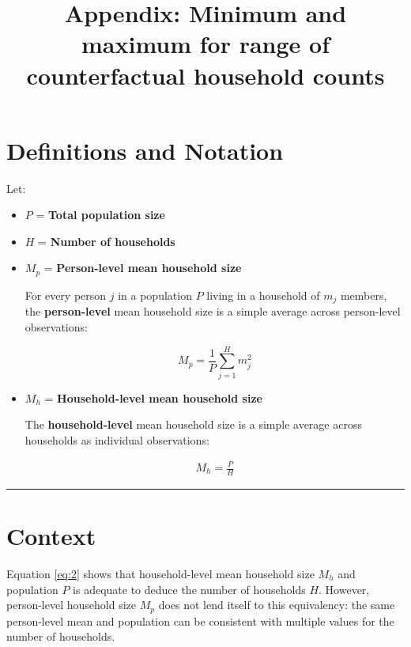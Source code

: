\documentclass[
]{article}
\title{Appendix: Minimum and maximum for range of counterfactual
household counts}
\author{}
\date{\vspace{-2.5em}}
\begin{document}
\maketitle

\hypertarget{definitions-and-notation}{%
\section{Definitions and Notation}\label{definitions-and-notation}}

Let:

\begin{itemize}
\item
  \(P\) = \textbf{Total population size}
\item
  \(H\) = \textbf{Number of households}
\item
  \(M_p\) = \textbf{Person-level mean household size}

  For every person \(j\) in a population \(P\) living in a household of
  \(m_j\) members, the \textbf{person-level} mean household size is a
  simple average across person-level observations:

  \begin{equation}
    \label{eq:1}
    \tag{1}
    M_p = \frac{1}{P} \sum_{j = 1}^H m_j^2
    \end{equation}
\item
  \(M_h\) = \textbf{Household-level mean household size}

  The \textbf{household-level} mean household size is a simple average
  across households as individual observations:

  \begin{align}
    \label{eq:2}
    \tag{2}
    M_h = \frac{P}{H}
    \end{align}
\end{itemize}

\begin{center}\rule{0.5\linewidth}{0.5pt}\end{center}

\hypertarget{context}{%
\section{Context}\label{context}}

Equation \eqref{eq:2} shows that household-level mean household size
\(M_h\) and population \(P\) is adequate to deduce the number of
households \(H\). However, person-level household size \(M_p\) does not
lend itself to this equivalency: the same person-level mean and
population can be consistent with multiple values for the number of
households.
\end{document}
